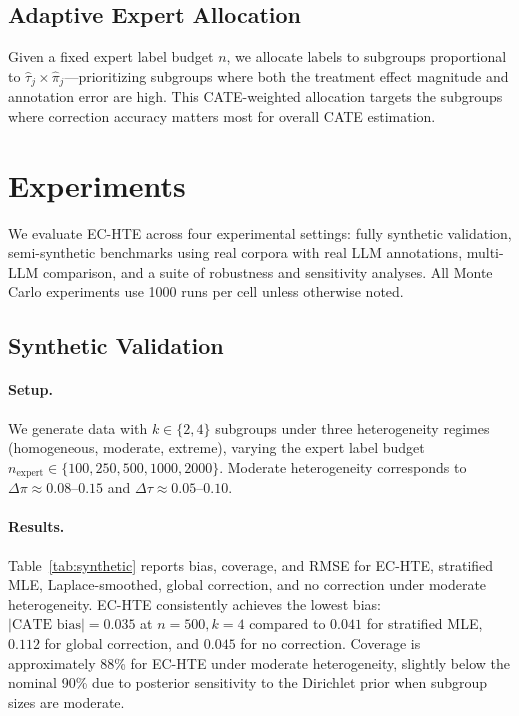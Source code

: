 \documentclass[11pt,a4paper]{article}
\begin{document}
\subsection{Adaptive Expert Allocation}
\label{sec:adaptive}

Given a fixed expert label budget $n$, we allocate labels to subgroups proportional to $\hat{\tau}_j \times \hat{\pi}_j$---prioritizing subgroups where both the treatment effect magnitude and annotation error are high.
This CATE-weighted allocation targets the subgroups where correction accuracy matters most for overall CATE estimation.

\section{Experiments}

We evaluate EC-HTE across four experimental settings: fully synthetic validation, semi-synthetic benchmarks using real corpora with real LLM annotations, multi-LLM comparison, and a suite of robustness and sensitivity analyses.
All Monte Carlo experiments use 1000 runs per cell unless otherwise noted.

\subsection{Synthetic Validation}
\label{sec:synthetic}

\paragraph{Setup.}
We generate data with $k \in \{2, 4\}$ subgroups under three heterogeneity regimes (homogeneous, moderate, extreme), varying the expert label budget $n_{\text{expert}} \in \{100, 250, 500, 1000, 2000\}$.
Moderate heterogeneity corresponds to $\Delta\pi \approx 0.08$--$0.15$ and $\Delta\tau \approx 0.05$--$0.10$.

\paragraph{Results.}
Table~\ref{tab:synthetic} reports bias, coverage, and RMSE for EC-HTE, stratified MLE, Laplace-smoothed, global correction, and no correction under moderate heterogeneity.
EC-HTE consistently achieves the lowest bias: $|\text{CATE bias}| = 0.035$ at $n = 500, k = 4$ compared to $0.041$ for stratified MLE, $0.112$ for global correction, and $0.045$ for no correction.
Coverage is approximately 88\% for EC-HTE under moderate heterogeneity, slightly below the nominal 90\% due to posterior sensitivity to the Dirichlet prior when subgroup sizes are moderate.
\end{document}
